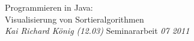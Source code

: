 \documentclass[dvips,letterpaper,12pt]{report}
\begin{document}

\thesistitle
	{Programmieren in Java: \\
	 Visualisierung von Sortieralgorithmen\\}
	{\emph{Kai Richard König (12.03)}}
	{Seminararbeit}
	{\emph{07 2011}}




% 
% 




 
% 
% 
% 



% 
\end{document}

